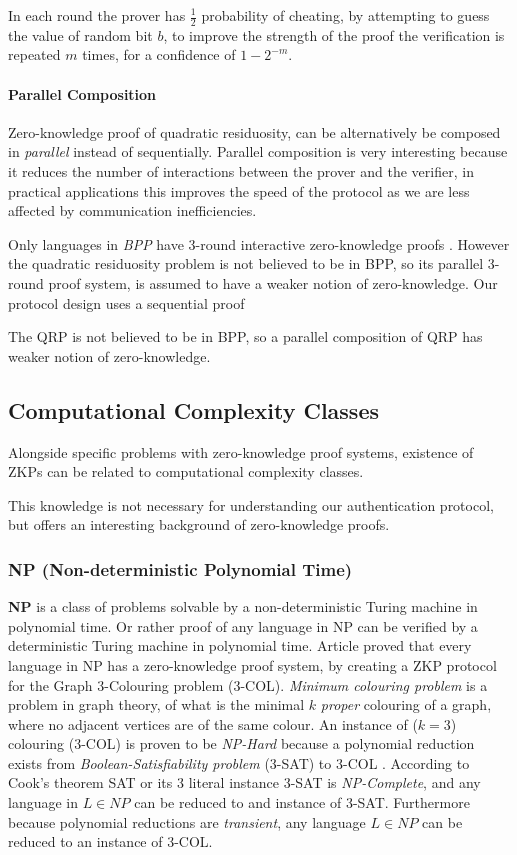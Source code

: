 In each round the prover has $\frac{1}{2}$ probability of cheating, by attempting to guess the value of random bit $b$, to improve the strength of the proof the verification is repeated $m$ times, for a confidence of $ 1-2^{-m}$.

\paragraph{Parallel Composition}
Zero-knowledge proof of quadratic residuosity, can be alternatively be composed in \textit{parallel} instead of sequentially.
Parallel composition is very interesting because it reduces the number of interactions between the prover and the verifier, in practical applications this improves the speed of the protocol as we are less affected by communication inefficiencies.

Only languages in \textit{BPP} have 3-round interactive zero-knowledge proofs \cite{goldreich1996composition}. 
However the quadratic residuosity problem is not believed to be in BPP, so its parallel 3-round proof system, is assumed to have a weaker notion of zero-knowledge.
Our protocol design uses a sequential proof

The QRP is not believed to be in BPP, so a parallel composition of QRP has weaker notion of zero-knowledge.


\subsection{Computational Complexity Classes}
Alongside specific problems with zero-knowledge proof systems, existence of ZKPs can be related to computational complexity classes.

This knowledge is not necessary for understanding our authentication protocol, but offers an interesting background of zero-knowledge proofs.

\subsubsection{NP (Non-deterministic Polynomial Time)}

\textbf{NP} is a class of problems solvable by a non-deterministic Turing machine in polynomial time. 
Or rather proof of any language in NP can be verified by a deterministic Turing machine in polynomial time.
\bigskip
\newline
Article \cite{GMW} proved that every language in NP has a zero-knowledge proof system, by creating a ZKP protocol for the Graph 3-Colouring problem (3-COL).
\textit{Minimum colouring problem} is a problem in graph theory, of what is the minimal $k$ \textit{proper} colouring of a graph, where no adjacent vertices are of the same colour.
An instance of ($k=3$) colouring (3-COL) is proven to be \textit{NP-Hard} because a polynomial reduction exists from \textit{Boolean-Satisfiability problem} (3-SAT) to 3-COL \cite{mouatadid2014introduction}.
According to Cook's theorem \cite{cook1971complexity} SAT or its 3 literal instance 3-SAT is \textit{NP-Complete}, and any language in $L \in NP$ can be reduced to and instance of 3-SAT. 
Furthermore because polynomial reductions are \textit{transient}, any language $L \in NP$ can be reduced to an instance of 3-COL.

